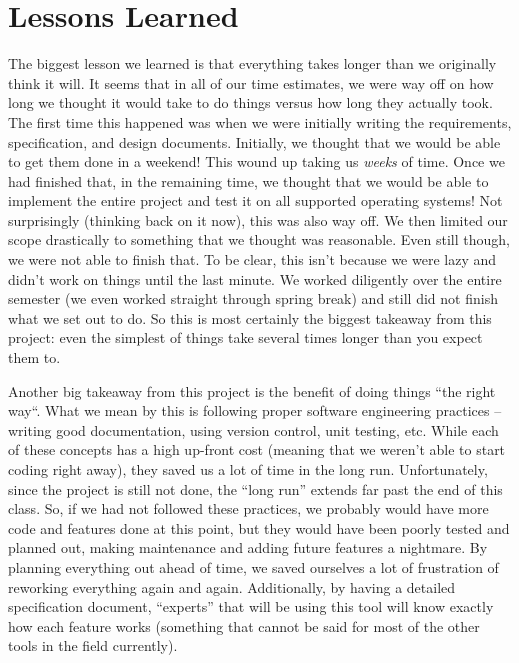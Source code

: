 \documentclass[letterpaper,12pt]{article}
\begin{document}
\newpage



\section{Lessons Learned} \label{lessons}
The biggest lesson we learned is that everything takes longer than we originally
think it will.  It seems that in all of our time estimates, we were way off on
how long we thought it would take to do things versus how long they actually
took.  The first time this happened was when we were initially writing the
requirements, specification, and design documents.  Initially, we thought that
we would be able to get them done in a weekend!  This wound up taking us
\textit{weeks} of time.  Once we had finished that, in the remaining time, we
thought that we would be able to implement the entire project and test it on all
supported operating systems!  Not surprisingly (thinking back on it now), this
was also way off.  We then limited our scope drastically to something that we
thought was reasonable.  Even still though, we were not able to finish that.  To
be clear, this isn't because we were lazy and didn't work on things until the
last minute.  We worked diligently over the entire semester (we even worked
straight through spring break) and still did not finish what we set out to do. 
So this is most certainly the biggest takeaway from this project: even the
simplest of things take several times longer than you expect them to.

Another big takeaway from this project is the benefit of doing things ``the
right way``.  What we mean by this is following proper software engineering
practices -- writing good documentation, using version control, unit testing,
etc.  While each of these concepts has a high up-front cost (meaning that we
weren't able to start coding right away), they saved us a lot of time in the
long run.  Unfortunately, since the project is still not done, the ``long run''
extends far past the end of this class.  So, if we had not followed these
practices, we probably would have more code and features done at this point, but
they would have been poorly tested and planned out, making maintenance and
adding future features a nightmare.  By planning everything out ahead of time,
we saved ourselves a lot of frustration of reworking everything again and again.
 Additionally, by having a detailed specification document, ``experts'' that
will be using this tool will know exactly how each feature works (something that
cannot be said for most of the other tools in the field currently).
\end{document}
